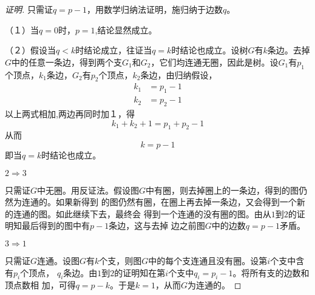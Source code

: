 \documentclass{article}
\newtheorem{Thm}{定理}
\begin{document}
\begin{CJK*}{UTF8}{gbsn}
\begin{proof}[证明]
    只需证$q=p-1$，用数学归纳法证明，施归纳于边数$q$。
    
    （１）当$q=0$时，$p=1$,结论显然成立。

    （２）假设当$q<k$时结论成立，往证当$q=k$时结论也成立。设树$G$有$k$条边。去掉$G$中的任意一条边，得到两个支$G_1$和$G_2$，它们均连通无圈，因此是树。设$G_1$有$p_1$个顶点，$k_1$条边，$G_2$有$p_2$个顶点，$k_2$条边，由归纳假设，
    \begin{equation*}
      \begin{split}
        k_1 &= p_1 - 1\\
        k_2 &= p_2 - 1
      \end{split}
    \end{equation*}
    以上两式相加,两边再同时加１，得
    \[k_1 + k_2  + 1 = p_1 + p_2 - 1\]
    从而
    \[k = p - 1 \]
    即当$q=k$时结论也成立。



    $2\Rightarrow3$

只需证$G$中无圈。用反证法。假设图$G$中有圈，则去掉圈上的一条边，得到的图仍然为连通的。如果新得到
的图仍然有圈，在圈上再去掉一条边，又会得到一个新的连通的图。如此继续下去，最终会
得到一个连通的没有圈的图。由从$1$到$2$的证明知最后得到的图中有$p-1$条边，这与去掉
边之前图$G$中的边数$q=p-1$矛盾。


 $3\Rightarrow1$

 只需证$G$连通。设图$G$有$k$个支，则图$G$中的每个支连通且没有圈。设第$i$个支中含有$p_i$个顶点，
$q_i$条边。由$1$到$2$的证明知在第$i$个支中$q_i=p_i-1$。将所有支的边数和顶点数相
加，可得$q = p-k$。于是$k=1$，从而$G$为连通的。
\end{proof}





\end{CJK*}
\end{document}
